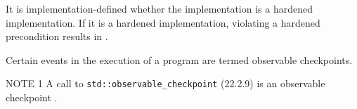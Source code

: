 \begin{modification}
It is implementation-defined whether the implementation is a hardened implementation. If it is a hardened
implementation, violating a hardened precondition results in .
\end{modification}

\begin{modification}
Certain events in the execution of a program are termed observable checkpoints.
\newline

NOTE 1 A call to \texttt{std::observable\_checkpoint} (22.2.9) is an observable
checkpoint .
\end{modification}
